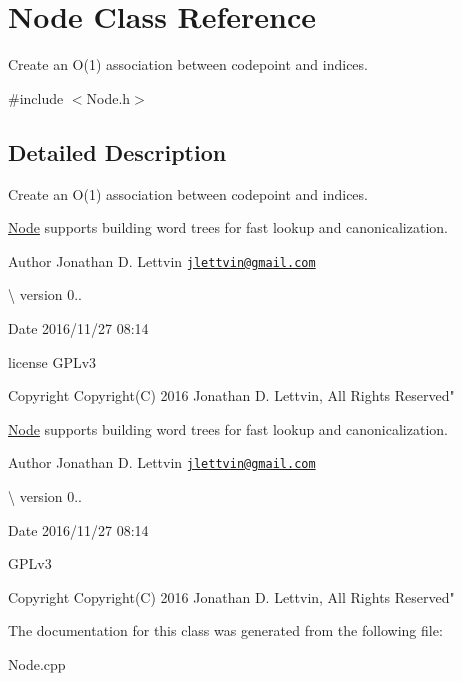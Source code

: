 \hypertarget{class_node}{}\section{Node Class Reference}
\label{class_node}


Create an O(1) association between codepoint and indices.  




{\ttfamily \#include $<$Node.\+h$>$}



\subsection{Detailed Description}
Create an O(1) association between codepoint and indices. 

\hyperlink{class_node}{Node} supports building word trees for fast lookup and canonicalization.

\begin{DoxyAuthor}{Author}
Jonathan D. Lettvin \href{mailto:jlettvin@gmail.com}{\tt jlettvin@gmail.\+com}
\end{DoxyAuthor}
\textbackslash{} version 0..

\begin{DoxyDate}{Date}
2016/11/27 08\+:14
\end{DoxyDate}
license G\+P\+Lv3

\begin{DoxyCopyright}{Copyright}
Copyright(\+C) 2016 Jonathan D. Lettvin, All Rights Reserved"
\end{DoxyCopyright}
\hyperlink{class_node}{Node} supports building word trees for fast lookup and canonicalization.

\begin{DoxyAuthor}{Author}
Jonathan D. Lettvin \href{mailto:jlettvin@gmail.com}{\tt jlettvin@gmail.\+com}
\end{DoxyAuthor}
\textbackslash{} version 0..

\begin{DoxyDate}{Date}
2016/11/27 08\+:14
\end{DoxyDate}
G\+P\+Lv3

\begin{DoxyCopyright}{Copyright}
Copyright(\+C) 2016 Jonathan D. Lettvin, All Rights Reserved" 
\end{DoxyCopyright}


The documentation for this class was generated from the following file\+:\begin{DoxyCompactItemize}
\item 
Node.\+cpp\end{DoxyCompactItemize}
